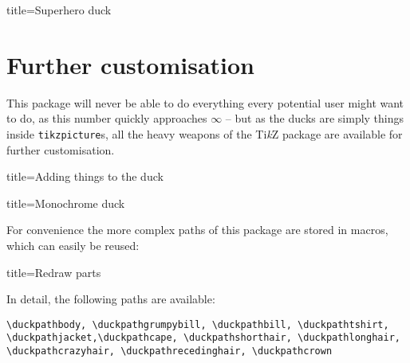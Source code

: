 \documentclass[parskip=half]{scrartcl}
\newcommand{\TikZ}{Ti\emph{k}Z\xspace}
\begin{document}
\begin{tcblisting}{title={Superhero duck}}
\begin{tikzpicture}
	\duck[mask=teal,cape=teal]
\end{tikzpicture}
\end{tcblisting}

\clearpage
\section{Further customisation}

This package will never be able to do everything every potential user might want to do, as this number quickly approaches $\infty$ -- but as the ducks are simply things inside \lstinline|tikzpicture|s, all the heavy weapons of the \TikZ package are available for further customisation.

\begin{tcblisting}{title={Adding things to the duck}}
\end{tcblisting}

\begin{tcblisting}{title={Monochrome duck}}
\end{tcblisting}

For convenience the more complex paths of this package are stored in macros, which can easily be reused:

\begin{tcblisting}{title={Redraw parts}}
\begin{tikzpicture}
	\duck
	\path[preaction={fill, red!50!black},pattern=fivepointed stars, pattern color=yellow]  
			\duckpathlonghair;
\end{tikzpicture}
\end{tcblisting}

In detail, the following paths are available:

\begin{lstlisting}[breakindent=0pt]
\duckpathbody, \duckpathgrumpybill, \duckpathbill, \duckpathtshirt, \duckpathjacket,\duckpathcape, \duckpathshorthair, \duckpathlonghair, \duckpathcrazyhair, \duckpathrecedinghair, \duckpathcrown
\end{lstlisting}
\end{document}
